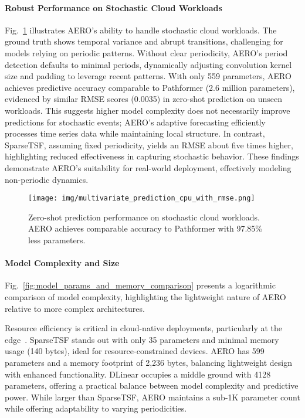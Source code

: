 \documentclass{ieeetmlcn}
\begin{document}
\paragraph*{Robust Performance on Stochastic Cloud Workloads}
\label{para:stochastic_workload_performance}
{\color{blue}
Fig.~\ref{fig:multivariate_prediction_cpu_with_rmse} illustrates AERO's ability to handle stochastic cloud workloads. The ground truth shows temporal variance and abrupt transitions, challenging for models relying on periodic patterns. Without clear periodicity, AERO's period detection defaults to minimal periods, dynamically adjusting convolution kernel size and padding to leverage recent patterns. With only 559 parameters, AERO achieves predictive accuracy comparable to Pathformer (2.6 million parameters), evidenced by similar RMSE scores (0.0035) in zero-shot prediction on unseen workloads. This suggests higher model complexity does not necessarily improve predictions for stochastic events; AERO's adaptive forecasting efficiently processes time series data while maintaining local structure. In contrast, SparseTSF, assuming fixed periodicity, yields an RMSE about five times higher, highlighting reduced effectiveness in capturing stochastic behavior. These findings demonstrate AERO's suitability for real-world deployment, effectively modeling non-periodic dynamics.
}


\begin{figure}\centering
[t]
    \centering
    \centering\texttt{[image: img/multivariate\_prediction\_cpu\_with\_rmse.png]}
    \caption{Zero-shot prediction performance on stochastic cloud workloads. AERO achieves comparable accuracy to Pathformer with 97.85\% less parameters.}
    \label{fig:multivariate_prediction_cpu_with_rmse}
\end{figure}
    
\paragraph*{Model Complexity and Size}
\label{sec:modelcomplexity}

Fig.~\ref{fig:model_params_and_memory_comparison} presents a logarithmic comparison of model complexity, highlighting the lightweight nature of AERO relative to more complex architectures.

Resource efficiency is critical in cloud-native deployments, particularly at the edge~\cite{waleffe2023mariusgnn}. SparseTSF stands out with only 35 parameters and minimal memory usage (140 bytes), ideal for resource-constrained devices. AERO has 599 parameters and a memory footprint of 2,236 bytes, balancing lightweight design with enhanced functionality. {\color{blue} DLinear occupies a middle ground with 4128 parameters, offering a practical balance between model complexity and predictive power.} While larger than SparseTSF, AERO maintains a sub-1K parameter count while offering adaptability to varying periodicities.
\end{document}
